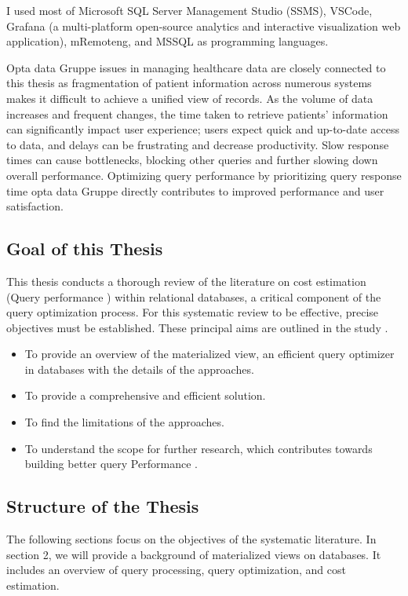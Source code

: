 I used most of Microsoft SQL Server Management Studio (SSMS), VSCode, Grafana (a multi-platform open-source analytics and interactive visualization web application), mRemoteng, and MSSQL as programming languages.\vspace{.4cm}

Opta data Gruppe issues in managing healthcare data are closely connected to this thesis as fragmentation of patient information across numerous systems makes it difficult to achieve a unified view of records. As the volume of data increases and frequent changes, the time taken to retrieve patients' information can significantly impact user experience; users expect quick and up-to-date access to data, and delays can be frustrating and decrease productivity. Slow response times can cause bottlenecks, blocking other queries and further slowing down overall performance. Optimizing query performance by prioritizing query response time opta data Gruppe directly contributes to improved performance and user satisfaction.

\subsection{Goal of this Thesis}
\normalsize
This thesis conducts a thorough review of the literature on cost estimation (Query performance ) within relational databases, a critical component of the query optimization process. For this systematic review to be effective, precise objectives must be established. These principal aims are outlined in the study \cite{CostEstimation}.
\begin{itemize}
  \item To provide an overview of the materialized view, an efficient query optimizer in databases with the details of the approaches.
  \item To provide a comprehensive and efficient solution.
  \item To find the limitations of the approaches.
  \item To understand the scope for further research, which contributes towards building
better query Performance \cite{CostEstimation}.
\end{itemize}
\subsection{Structure of the Thesis }
The following sections focus on the objectives of the systematic literature. In section 2, we will provide a background of materialized views on databases. It includes an overview of query processing, query optimization, and cost estimation.\vspace{.4cm}


